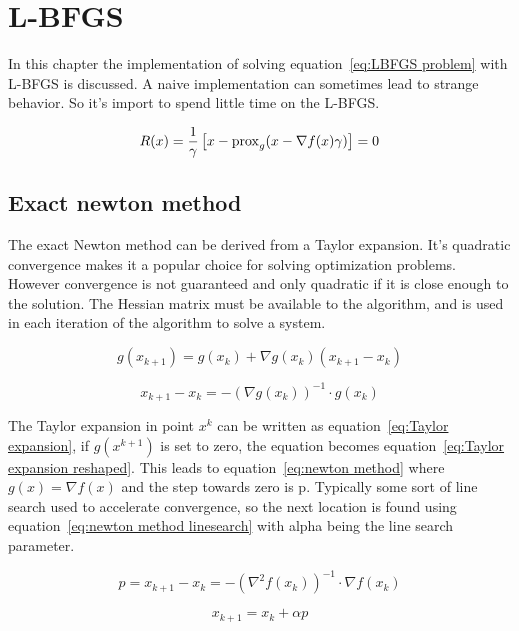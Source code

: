 \chapter{L-BFGS}
	In this chapter the implementation of solving equation~\ref{eq:LBFGS problem} with L-BFGS is discussed. A naive implementation can sometimes lead to strange behavior. So it's import to spend little time on the L-BFGS.
	
	
	\begin{equation}
	R(x) = \frac{1}{\gamma}\left[ x - \operatorname{prox}_g( x - \nabla f(x)\gamma) \right] = 0
	\label{eq:LBFGS problem}
	\end{equation}
	
	\section{Exact newton method}
	The exact Newton method can be derived from a Taylor expansion. It's quadratic convergence makes it a popular choice for solving optimization problems. However convergence is not guaranteed and only quadratic if it is close enough to the solution. The Hessian matrix must be available to the algorithm, and is used in each iteration of the algorithm to solve a system.
	
		\begin{equation}
			g(x_{k+1}) = g(x_k) + \nabla g(x_k)(x_{k+1}-x_k)
			\label{eq:Taylor expansion}
		\end{equation}
		
		\begin{equation}
			x_{k+1}-x_k = -(\nabla g(x_k))^{-1} \cdot g(x_k)
			\label{eq:Taylor expansion reshaped}
		\end{equation}
		
	The Taylor expansion in point $x^k$ can be written as equation~\ref{eq:Taylor expansion}, if $g(x^{k+1})$ is set to zero, the equation becomes equation~\ref{eq:Taylor expansion reshaped}. This leads to equation~\ref{eq:newton method} where $g(x)=\nabla f(x)$ and the step towards zero is p. Typically some sort of line search used to accelerate convergence, so the next location is found using equation~\ref{eq:newton method linesearch} with alpha being the line search parameter.	
	
		\begin{equation}
			p = x_{k+1}-x_k = -(\nabla^2 f(x_k))^{-1} \cdot \nabla f(x_k)
			\label{eq:newton method}	
		\end{equation}
	
		\begin{equation}
		 	x_{k+1} = x_k + \alpha p
		 	\label{eq:newton method linesearch}
		\end{equation}
		
